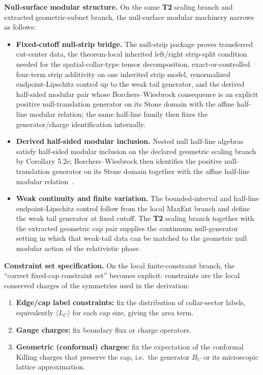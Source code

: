\textbf{Null-surface modular structure.} On the same \textbf{T2} scaling branch and extracted geometric-subnet branch, the null-surface modular machinery narrows as follows:
\begin{itemize}
\item
\textbf{Fixed-cutoff null-strip bridge.} The null-strip package proves transferred cut-center data, the theorem-local inherited left/right strip-split condition needed for the spatial-collar-type tensor decomposition, exact-or-controlled four-term strip additivity on one inherited strip model, renormalized endpoint-Lipschitz control up to the weak tail generator, and the derived half-sided modular pair whose Borchers--Wiesbrock consequence is an explicit positive null-translation generator on its Stone domain with the affine half-line modular relation; the same half-line family then fixes the generator/charge identification internally.
\item
\textbf{Derived half-sided modular inclusion.} Nested null half-line algebras satisfy half-sided modular inclusion on the declared geometric scaling branch by Corollary 5.2e; Borchers--Wiesbrock then identifies the positive null-translation generator on its Stone domain together with the affine half-line modular relation~\cite{wiesbrock93}.
\item
\textbf{Weak continuity and finite variation.} The bounded-interval and half-line endpoint-Lipschitz control follow from the local MaxEnt branch and define the weak tail generator at fixed cutoff. The \textbf{T2} scaling branch together with the extracted geometric cap pair supplies the continuum null-generator setting in which that weak-tail data can be matched to the geometric null modular action of the relativistic phase.
\end{itemize}

\textbf{Constraint set specification.} On the local finite-constraint branch, the ``correct fixed-cap constraint set'' becomes explicit: constraints are the local conserved charges of the symmetries used in the derivation:
\begin{enumerate}
\def\labelenumi{\arabic{enumi}.}
\item
\textbf{Edge/cap label constraints:} fix the distribution of collar-sector labels, equivalently \(\langle L_C\rangle\) for each cap size, giving the area term.
\item
\textbf{Gauge charges:} fix boundary flux or charge operators.
\item
\textbf{Geometric (conformal) charges:} fix the expectation of the conformal Killing charges that preserve the cap, i.e.\ the generator \(B_C\) or its microscopic lattice approximation.
\end{enumerate}

